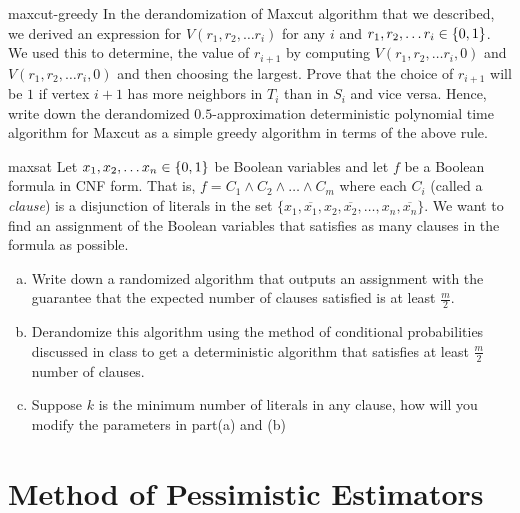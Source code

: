 \begin{exercise-prob}
\begin{show-ps1}{maxcut-greedy}
In the derandomization of {\sc Maxcut} algorithm that we described, we derived an expression for $V(r_1, r_2, \ldots r_i)$ for any $i$ and $r_1, r_2, \ldots r_i \in \{0,1\}$. We used this to determine, the value of $r_{i+1}$ by computing $V(r_1, r_2, \dots r_i, 0)$ and $V(r_1, r_2, \dots r_i, 0)$ and then choosing the largest.
Prove that the choice of $r_{i+1}$ will be $1$ if vertex $i+1$ has more neighbors in $T_i$ than in $S_i$ and vice versa. Hence, write down the derandomized $0.5$-approximation deterministic polynomial time algorithm for {\sc Maxcut} as a simple greedy algorithm in terms of the above rule.
\end{show-ps1}
\end{exercise-prob}


\begin{exercise-prob}
\begin{show-ps1}{maxsat}
Let $x_1, x_2, \ldots x_n \in \{0,1\}$ be Boolean variables and let $f$ be a Boolean formula in CNF form. That is, $f = C_1 \land C_2 \land \ldots \land C_m$ where each $C_i$ (called a {\em clause}) is a disjunction of literals in the set $\{x_1, \overline{x_1}, x_2, \overline{x_2}, \ldots, x_n, \overline{x_n} \}$. We want to find an assignment of the Boolean variables that satisfies as many clauses in the formula as possible.
\begin{enumerate}[(a)]
\item Write down a randomized algorithm that outputs an assignment with the guarantee that the expected number of clauses satisfied is at least $\frac{m}{2}$.
\item Derandomize this algorithm using the method of conditional probabilities discussed in class to get a deterministic algorithm that satisfies at least $\frac{m}{2}$ number of clauses.
\item Suppose $k$ is the minimum number of literals in any clause, how will you modify the parameters in part(a) and (b) 
\end{enumerate}
\end{show-ps1}
\end{exercise-prob}

\section{Method of Pessimistic Estimators}

